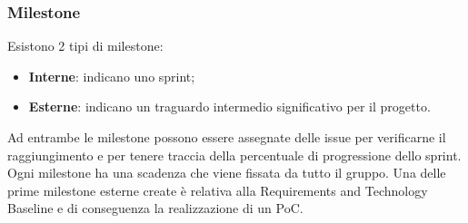 \subsubsection{Milestone}
Esistono 2 tipi di milestone:
\begin{itemize}
    \item \textbf{Interne}: indicano uno sprint;
    \item \textbf{Esterne}: indicano un traguardo intermedio significativo per il progetto.
\end{itemize}
Ad entrambe le milestone possono essere assegnate delle issue per verificarne il raggiungimento e per tenere traccia
della percentuale di progressione dello sprint.
Ogni milestone ha una scadenza che viene fissata da tutto il gruppo. Una delle prime milestone esterne create è
relativa alla Requirements and Technology Baseline e di conseguenza la realizzazione di un PoC.

